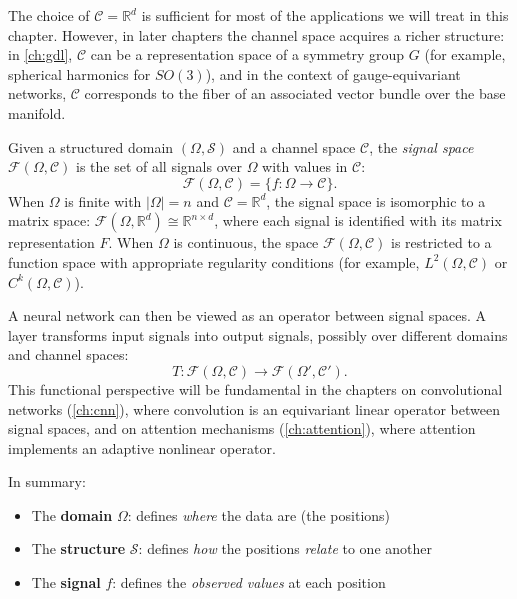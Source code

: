\begin{remark}\label{rem:espacio_canales_general}
The choice of $\mathcal{C} = \mathbb{R}^d$ is sufficient for most of the applications we will treat in this chapter. However, in later chapters the channel space acquires a richer structure: in \autoref{ch:gdl}, $\mathcal{C}$ can be a representation space of a symmetry group $G$ (for example, spherical harmonics for $SO(3)$), and in the context of gauge-equivariant networks, $\mathcal{C}$ corresponds to the fiber of an associated vector bundle over the base manifold.
\end{remark}

\begin{definition}\label{def:espacio_senales}
Given a structured domain $(\Omega, \mathcal{S})$ and a channel space $\mathcal{C}$, the \textit{signal space} $\mathcal{F}(\Omega, \mathcal{C})$ is the set of all signals over $\Omega$ with values in $\mathcal{C}$:
\[
\mathcal{F}(\Omega, \mathcal{C}) = \{f: \Omega \to \mathcal{C}\}.
\]
When $\Omega$ is finite with $|\Omega| = n$ and $\mathcal{C} = \mathbb{R}^d$, the signal space is isomorphic to a matrix space: $\mathcal{F}(\Omega, \mathbb{R}^d) \cong \mathbb{R}^{n \times d}$, where each signal is identified with its matrix representation $F$. When $\Omega$ is continuous, the space $\mathcal{F}(\Omega, \mathcal{C})$ is restricted to a function space with appropriate regularity conditions (for example, $L^2(\Omega, \mathcal{C})$ or $C^k(\Omega, \mathcal{C})$).
\end{definition}

A neural network can then be viewed as an operator between signal spaces. A layer transforms input signals into output signals, possibly over different domains and channel spaces:
\[
T: \mathcal{F}(\Omega, \mathcal{C}) \to \mathcal{F}(\Omega', \mathcal{C}').
\]
This functional perspective will be fundamental in the chapters on convolutional networks (\autoref{ch:cnn}), where convolution is an equivariant linear operator between signal spaces, and on attention mechanisms (\autoref{ch:attention}), where attention implements an adaptive nonlinear operator.

In summary:
\begin{itemize}
	\item The \textbf{domain} $\Omega$: defines \textit{where} the data are (the positions)
	\item The \textbf{structure} $\mathcal{S}$: defines \textit{how} the positions \textit{relate} to one another
	\item The \textbf{signal} $f$: defines the \textit{observed values} at each position
\end{itemize}

